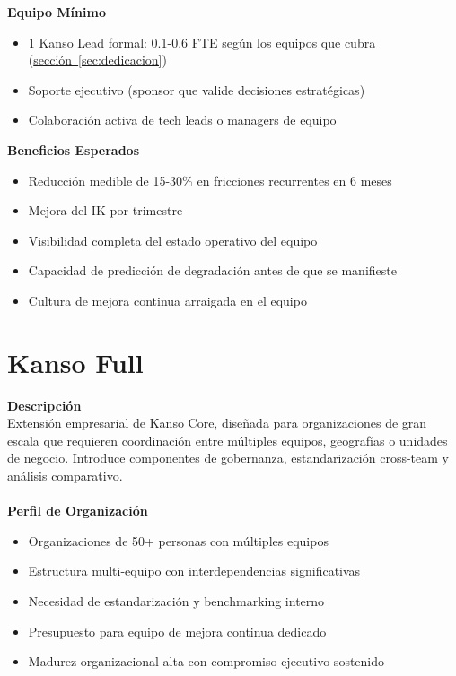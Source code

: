 \textbf{Equipo Mínimo}
\begin{itemize}
    \item 1 Kanso Lead formal: 0.1-0.6 FTE según los equipos que cubra (\hyperref[sec:dedicacion]{sección~\ref{sec:dedicacion}})
    \item Soporte ejecutivo (sponsor que valide decisiones estratégicas)
    \item Colaboración activa de tech leads o managers de equipo
\end{itemize}

\textbf{Beneficios Esperados}
\begin{itemize}
    \item Reducción medible de 15-30\% en fricciones recurrentes en 6 meses
    \item Mejora del IK por trimestre
    \item Visibilidad completa del estado operativo del equipo
    \item Capacidad de predicción de degradación antes de que se manifieste
    \item Cultura de mejora continua arraigada en el equipo
\end{itemize}

\section{Kanso Full}

\textbf{Descripción}\\
Extensión empresarial de Kanso Core, diseñada para organizaciones de gran escala que requieren coordinación entre múltiples equipos, geografías o unidades de negocio. Introduce componentes de gobernanza, estandarización cross-team y análisis comparativo.
\\
\\
\textbf{Perfil de Organización}
\begin{itemize}
    \item Organizaciones de 50+ personas con múltiples equipos
    \item Estructura multi-equipo con interdependencias significativas
    \item Necesidad de estandarización y benchmarking interno
    \item Presupuesto para equipo de mejora continua dedicado
    \item Madurez organizacional alta con compromiso ejecutivo sostenido
\end{itemize}

